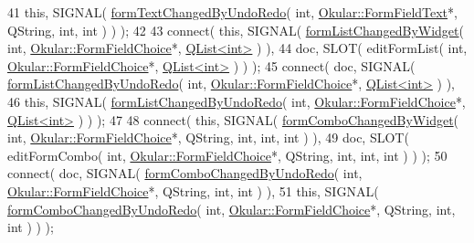 \begin{DoxyCode}
41              \textcolor{keyword}{this}, SIGNAL( \hyperlink{classFormWidgetsController_a83510071c6ada2c746f4ef289577d6ef}{formTextChangedByUndoRedo}( \textcolor{keywordtype}{int}, 
      \hyperlink{classOkular_1_1FormFieldText}{Okular::FormFieldText}*, QString, \textcolor{keywordtype}{int}, \textcolor{keywordtype}{int} ) ) );
42 
43     connect( \textcolor{keyword}{this}, SIGNAL( \hyperlink{classFormWidgetsController_ab6d422dffb0d6205288da0b2bae3b733}{formListChangedByWidget}( \textcolor{keywordtype}{int}, 
      \hyperlink{classOkular_1_1FormFieldChoice}{Okular::FormFieldChoice}*, \hyperlink{classQList}{QList<int>} ) ),
44              doc, SLOT( editFormList( \textcolor{keywordtype}{int}, \hyperlink{classOkular_1_1FormFieldChoice}{Okular::FormFieldChoice}*, 
      \hyperlink{classQList}{QList<int>} ) ) );
45     connect( doc, SIGNAL( \hyperlink{classFormWidgetsController_a41ab728e4ee6afd79111f710eccbdb91}{formListChangedByUndoRedo}( \textcolor{keywordtype}{int}, 
      \hyperlink{classOkular_1_1FormFieldChoice}{Okular::FormFieldChoice}*, \hyperlink{classQList}{QList<int>} ) ),
46              \textcolor{keyword}{this}, SIGNAL( \hyperlink{classFormWidgetsController_a41ab728e4ee6afd79111f710eccbdb91}{formListChangedByUndoRedo}( \textcolor{keywordtype}{int},
      \hyperlink{classOkular_1_1FormFieldChoice}{Okular::FormFieldChoice}*, \hyperlink{classQList}{QList<int>} ) ) );
47 
48     connect( \textcolor{keyword}{this}, SIGNAL( \hyperlink{classFormWidgetsController_a07ea26d5a5f144537941f001c8e2dd1e}{formComboChangedByWidget}( \textcolor{keywordtype}{int}, 
      \hyperlink{classOkular_1_1FormFieldChoice}{Okular::FormFieldChoice}*, QString, \textcolor{keywordtype}{int}, \textcolor{keywordtype}{int}, \textcolor{keywordtype}{int} ) ),
49              doc, SLOT( editFormCombo( \textcolor{keywordtype}{int}, \hyperlink{classOkular_1_1FormFieldChoice}{Okular::FormFieldChoice}*, QString, \textcolor{keywordtype}{int}, \textcolor{keywordtype}{
      int}, \textcolor{keywordtype}{int} ) ) );
50     connect( doc, SIGNAL( \hyperlink{classFormWidgetsController_a7a69cd267b127c5fd87319228205f77d}{formComboChangedByUndoRedo}( \textcolor{keywordtype}{int}, 
      \hyperlink{classOkular_1_1FormFieldChoice}{Okular::FormFieldChoice}*, QString, \textcolor{keywordtype}{int}, \textcolor{keywordtype}{int} ) ),
51              \textcolor{keyword}{this}, SIGNAL( \hyperlink{classFormWidgetsController_a7a69cd267b127c5fd87319228205f77d}{formComboChangedByUndoRedo}( \textcolor{keywordtype}{int}, 
      \hyperlink{classOkular_1_1FormFieldChoice}{Okular::FormFieldChoice}*, QString, \textcolor{keywordtype}{int}, \textcolor{keywordtype}{int} ) ) );

\end{DoxyCode}
